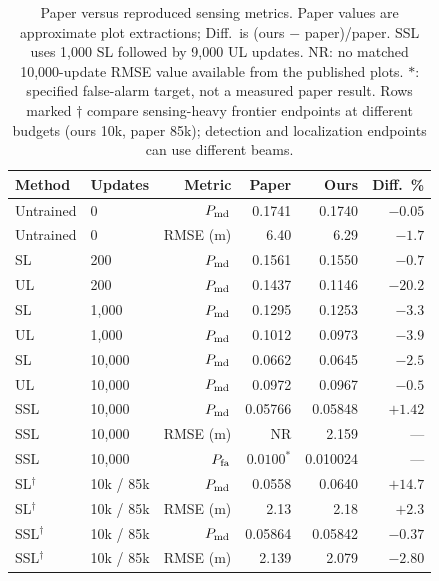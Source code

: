 \documentclass[conference]{IEEEtran}
\begin{document}
\begin{table}[t]\centering\small
\caption{Paper versus reproduced sensing metrics. Paper values are approximate plot extractions; Diff.\ is (ours $-$ paper)/paper. SSL uses 1,000 SL followed by 9,000 UL updates. NR: no matched 10,000-update RMSE value available from the published plots. $*$: specified false-alarm target, not a measured paper result. Rows marked $\dagger$ compare sensing-heavy frontier endpoints at different budgets (ours 10k, paper 85k); detection and localization endpoints can use different beams.}\label{tab:repro}
\setlength{\tabcolsep}{3pt}
\begin{tabular}{llrrrr}\toprule
Method & Updates & Metric & Paper & Ours & Diff.\ \%\\\midrule
Untrained & 0 & $P_{\rm md}$ & 0.1741 & 0.1740 & $-0.05$\\
Untrained & 0 & RMSE (m) & 6.40 & 6.29 & $-1.7$\\
SL & 200 & $P_{\rm md}$ & 0.1561 & 0.1550 & $-0.7$\\
UL & 200 & $P_{\rm md}$ & 0.1437 & 0.1146 & $-20.2$\\
SL & 1,000 & $P_{\rm md}$ & 0.1295 & 0.1253 & $-3.3$\\
UL & 1,000 & $P_{\rm md}$ & 0.1012 & 0.0973 & $-3.9$\\
SL & 10,000 & $P_{\rm md}$ & 0.0662 & 0.0645 & $-2.5$\\
UL & 10,000 & $P_{\rm md}$ & 0.0972 & 0.0967 & $-0.5$\\
SSL & 10,000 & $P_{\rm md}$ & 0.05766 & 0.05848 & $+1.42$\\
SSL & 10,000 & RMSE (m) & NR & 2.159 & ---\\
SSL & 10,000 & $P_{\rm fa}$ & $0.0100^*$ & 0.010024 & ---\\\midrule
SL$^\dagger$ & 10k / 85k & $P_{\rm md}$ & 0.0558 & 0.0640 & $+14.7$\\
SL$^\dagger$ & 10k / 85k & RMSE (m) & 2.13 & 2.18 & $+2.3$\\
SSL$^\dagger$ & 10k / 85k & $P_{\rm md}$ & 0.05864 & 0.05842 & $-0.37$\\
SSL$^\dagger$ & 10k / 85k & RMSE (m) & 2.139 & 2.079 & $-2.80$\\\bottomrule
\end{tabular}
\end{table}
\end{document}
